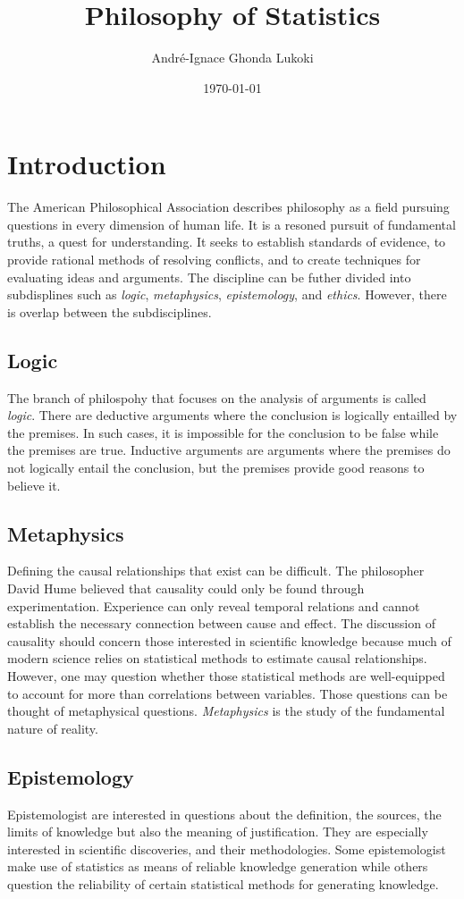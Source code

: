 \documentclass{article}
\title{Philosophy of Statistics}
\author{André-Ignace Ghonda Lukoki}
\date{\today}
\begin{document}
\maketitle

\section{Introduction}
The American Philosophical Association describes philosophy as a field pursuing
questions in every dimension of human life. It is a resoned pursuit of fundamental
truths, a quest for understanding. It seeks to establish standards of evidence, to
provide rational methods of resolving conflicts, and to create techniques for
evaluating ideas and arguments. The discipline can be futher divided into subdisplines
such as \textit{logic}, \textit{metaphysics}, \textit{epistemology}, and \textit{ethics}.
However, there is overlap between the subdisciplines.

\subsection{Logic}
The branch of philospohy that focuses on the analysis of arguments is called \textit{logic}.
There are deductive arguments where the conclusion is logically entailled by the premises.
In such cases, it is impossible for the conclusion to be false while the premises are true.
Inductive arguments are arguments where the premises do not logically entail the conclusion,
but the premises provide good reasons to believe it.

\subsection{Metaphysics}
Defining the causal relationships that exist can be difficult. The philosopher David Hume
believed that causality could only be found through experimentation. Experience can only
reveal temporal relations and cannot establish the necessary connection between cause and effect.
The discussion of causality should concern those interested in scientific knowledge
because much of modern science relies on statistical methods to estimate causal relationships.
However, one may question whether those statistical methods are well-equipped to account
for more than correlations between variables. Those questions can be thought of metaphysical questions.
\textit{Metaphysics} is the study of the fundamental nature of reality.

\subsection{Epistemology}
Epistemologist are interested in questions about the definition, the sources, the limits of knowledge
but also the meaning of justification. They are especially interested in scientific discoveries, and
their methodologies. Some epistemologist make use of statistics as means of reliable knowledge generation
while others question the reliability of certain statistical methods for generating knowledge.
\end{document}
